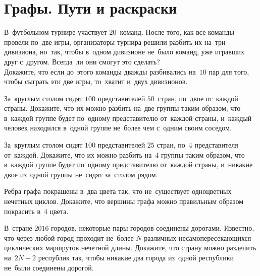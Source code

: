 
\section*{Графы. Пути и раскраски}


\begin{problems}

\item
\subproblem
В~футбольном турнире участвует $20$~команд.
После того, как все команды провели по~две игры, организаторы турнира решили
разбить их на~три дивизиона, но~так, чтобы в~одном дивизионе не~было команд,
уже игравших друг с~другом.
Всегда~ли они смогут это сделать?
\\
\subproblem
Докажите, что если до~этого команды дважды разбивались на~$10$ пар для того,
чтобы сыграть эти две игры, то~хватит и~двух дивизионов.

\item
За~круглым столом сидят $100$ представителей $50$~стран, по~двое от~каждой
страны.
Докажите, что их можно разбить на~две группы таким образом, что в~каждой группе
будет по~одному представителю от~каждой страны, и~каждый человек находился
в~одной группе не~более чем с~одним своим соседом.

\item
За~круглым столом сидят $100$ представителей $25$ стран, по~$4$ представителя
от~каждой.
Докажите, что их можно разбить на~$4$ группы таким образом, что в~каждой группе
будет по~одному представителю от~каждой страны, и~никакие двое из~одной группы
не~сидят за~столом рядом.


\item
Ребра графа покрашены в~два цвета так, что не~существует одноцветных нечетных
циклов.
Докажите, что вершины графа можно правильным образом покрасить в~$4$ цвета.

\item
В~стране $2016$ городов, некоторые пары городов соединены дорогами.
Известно, что через любой город проходит не~более $N$ различных
несамопересекающихся циклических маршрутов нечетной длины.
Докажите, что страну можно разделить на~$2 N + 2$ республик так, чтобы
никакие два города из~одной республики не~были соединены дорогой.


\end{problems}
